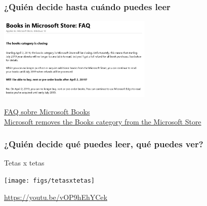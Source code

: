 \documentclass[17pt,aspectratio=169]{beamer}
\begin{document}
\begin{frame}
\frametitle{¿Quién decide hasta cuándo puedes leer}

\begin{center}
\includegraphics[height=4cm]{figs/books-microsoft}
\end{center}

  \begin{flushright}
    {\tiny
      \href{https://support.microsoft.com/en-us/help/4497396/books-in-microsoft-store-faq}{FAQ sobre Microsoft Books}\\
      \href{https://www.zdnet.com/article/microsoft-removes-the-books-category-from-the-microsoft-store/}{Microsoft removes the Books category from the Microsoft Store}\\
    }
  \end{flushright}

\end{frame}



\begin{frame}
\frametitle{¿Quién decide qué puedes leer, qué puedes ver?}

  Tetas x tetas

\begin{center}
\texttt{[image: figs/tetasxtetas]}
\end{center}

{\tiny \url{https://youtu.be/vOP9hEhYCek}}
\end{frame}




\end{document}
